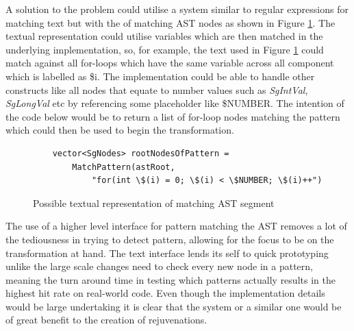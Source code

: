 \documentclass[bsc,frontabs,singlespacing,twoside,parskip,deptreport]{infthesis}
\begin{document}
A solution to the problem could utilise a system similar to regular expressions for matching text \cite{} but with the of matching AST nodes as shown in  Figure \ref{fig:adv-ast-matching}. The textual representation could utilise variables which are then matched in the underlying implementation, so, for example, the text used in Figure \ref{fig:adv-ast-matching} could match against all for-loops which have the same variable across all component which is labelled as \$i. The implementation could be able to handle other constructs like all nodes that equate to number values such as \textit{SgIntVal}, \textit{SgLongVal} etc by referencing some placeholder like \$NUMBER. The intention of the code below would be to return a list of for-loop nodes matching the pattern which could then be used to begin the transformation.


 \begin{figure}[H]
    \centering
    \begin{verbatim}
    vector<SgNodes> rootNodesOfPattern =
        MatchPattern(astRoot,
            "for(int \$(i) = 0; \$(i) < \$NUMBER; \$(i)++")
    \end{verbatim}
    \caption{Possible textual representation of matching AST segment}
    \label{fig:adv-ast-matching}
\end{figure}


The use of a higher level interface for pattern matching the AST removes a lot of the tediousness in trying to detect pattern, allowing for the focus to be on the transformation at hand. The text interface lends its self to quick prototyping unlike the large scale changes need to check every new node in a pattern, meaning the turn around time in testing which patterns actually results in the highest hit rate on real-world code. Even though the implementation details would be large undertaking it is clear that the system or a similar one would be of great benefit to the creation of rejuvenations.

    




\end{document}
